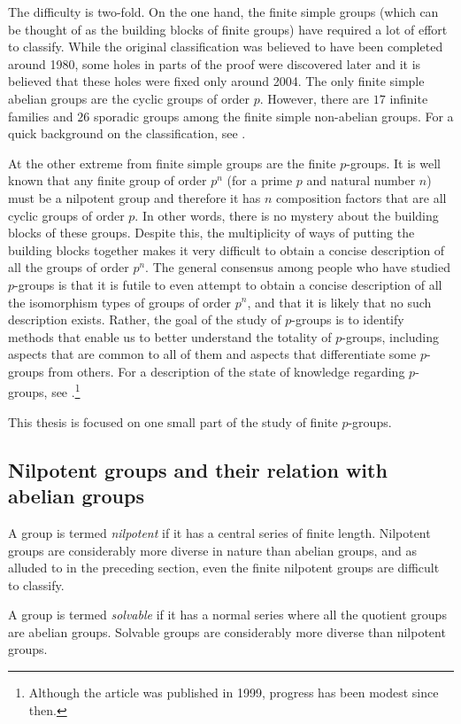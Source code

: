 The difficulty is two-fold. On the one hand, the finite simple groups
(which can be thought of as the building blocks of finite groups) have
required a lot of effort to classify. While the original
classification was believed to have been completed around 1980, some
holes in parts of the proof were discovered later and it is believed
that these holes were fixed only around 2004. The only finite simple
abelian groups are the cyclic groups of order $p$. However, there are
$17$ infinite families and $26$ sporadic groups among the finite
simple non-abelian groups. For a quick background on the
classification, see \cite{Asch2004}.

At the other extreme from finite simple groups are the finite
$p$-groups. It is well known that any finite group of order $p^n$ (for
a prime $p$ and natural number $n$) must be a nilpotent group and
therefore it has $n$ composition factors that are all cyclic groups of
order $p$. In other words, there is no mystery about the building
blocks of these groups. Despite this, the multiplicity of ways of
putting the building blocks together makes it very difficult to obtain
a concise description of all the groups of order $p^n$. The general
consensus among people who have studied $p$-groups is that it is
futile to even attempt to obtain a concise description of all the
isomorphism types of groups of order $p^n$, and that it is likely that
no such description exists. Rather, the goal of the study of
$p$-groups is to identify methods that enable us to better understand
the totality of $p$-groups, including aspects that are common to all
of them and aspects that differentiate some $p$-groups from
others. For a description of the state of knowledge regarding
$p$-groups, see \cite{Mann99}.\footnote{Although the article was
  published in 1999, progress has been modest since then.}

This thesis is focused on one small part of the study of finite
$p$-groups.

\subsection{Nilpotent groups and their relation with abelian groups}

A group is termed {\em nilpotent} if it has a central series of finite
length. Nilpotent groups are considerably more diverse in nature than
abelian groups, and as alluded to in the preceding section, even the
finite nilpotent groups are difficult to classify.

A group is termed {\em solvable} if it has a normal series where all
the quotient groups are abelian groups. Solvable groups are
considerably more diverse than nilpotent groups.

